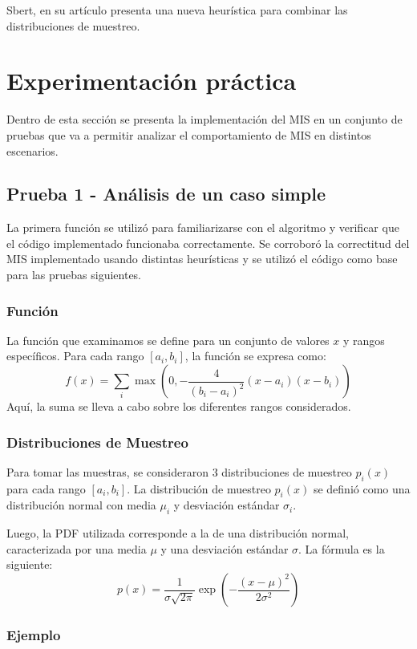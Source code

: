 \documentclass{article}
\begin{document}
Sbert, en su artículo \cite{Sbert2016} presenta una nueva heurística para combinar las distribuciones de muestreo.

\section{Experimentación práctica}

Dentro de esta sección se presenta la implementación del MIS en un conjunto de pruebas que va a permitir analizar el comportamiento de MIS en distintos escenarios.

\subsection{Prueba 1 - Análisis de un caso simple}

La primera función se utilizó para familiarizarse con el algoritmo y verificar que el código implementado funcionaba correctamente.
Se corroboró la correctitud del MIS implementado usando distintas heurísticas y se utilizó el código como base para las pruebas siguientes.

\subsubsection{Función}
La función que examinamos se define para un conjunto de valores \( x \) y rangos específicos. Para cada rango \( [a_{i}, b_{i}] \), la función se expresa como:
$$
f(x) = \sum_{i} \max\left(0, -\frac{4}{(b_{i} - a_{i})^2} (x - a_{i})(x - b_{i})\right)
$$
Aquí, la suma se lleva a cabo sobre los diferentes rangos considerados.

\subsubsection{Distribuciones de Muestreo}

Para tomar las muestras, se consideraron 3 distribuciones de muestreo \( p_{i}(x) \) para cada rango \( [a_{i}, b_{i}] \).
La distribución de muestreo \( p_{i}(x) \) se definió como una distribución normal con media \( \mu_{i} \) y desviación estándar \( \sigma_{i} \).

Luego, la PDF utilizada corresponde a la de una distribución normal, caracterizada por una media \( \mu \) y una desviación estándar \( \sigma \). La fórmula es la siguiente:
$$
p(x) = \frac{1}{\sigma \sqrt{2\pi}} \exp\left(-\frac{(x - \mu)^2}{2\sigma^2}\right)
$$


\subsubsection{Ejemplo}
\end{document}
